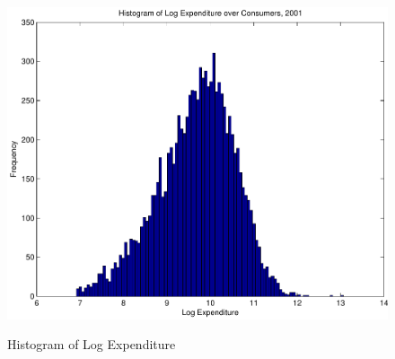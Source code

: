 \documentclass[12pt]{article}
\begin{document}
\begin{figure}
	\centering
		\includegraphics[scale=.8]{pics/exphist_cropped.pdf}
	\label{fig:exphist}
	\caption{Histogram of  Log Expenditure}
\end{figure}
\end{document}
